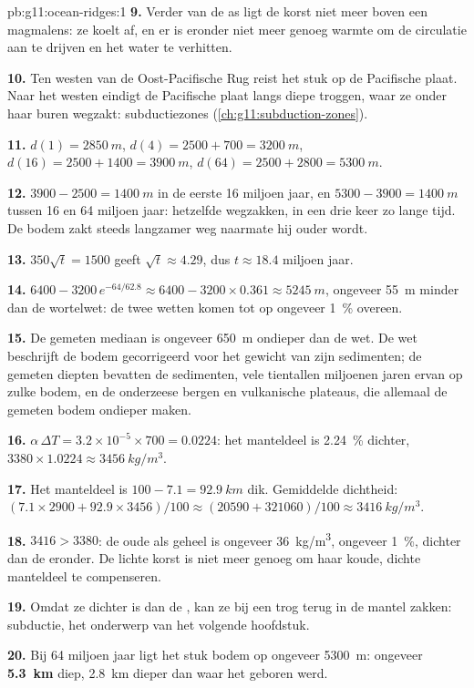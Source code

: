 \begin{solution}{pb:g11:ocean-ridges:1}
\textbf{9.} Verder van de as ligt de korst niet meer boven een magmalens: ze
koelt af, en er is eronder niet meer genoeg warmte om de circulatie aan te drijven
en het water te verhitten.

\textbf{10.} Ten westen van de Oost-Pacifische Rug reist het stuk op de Pacifische
plaat. Naar het westen eindigt de Pacifische plaat langs diepe troggen, waar ze
onder haar buren wegzakt: subductiezones (\cref{ch:g11:subduction-zones}).

\textbf{11.} $d(1) = \qty{2850}{m}$, $d(4) = 2500 + 700 = \qty{3200}{m}$,
$d(16) = 2500 + 1400 = \qty{3900}{m}$, $d(64) = 2500 + 2800 = \qty{5300}{m}$.

\textbf{12.} $3900 - 2500 = \qty{1400}{m}$ in de eerste 16 miljoen jaar,
en $5300 - 3900 = \qty{1400}{m}$ tussen 16 en 64 miljoen jaar: hetzelfde
wegzakken, in een drie keer zo lange tijd. De bodem zakt steeds langzamer weg
naarmate hij ouder wordt.

\textbf{13.} $350\sqrt{t} = 1500$ geeft $\sqrt{t} \approx 4.29$, dus
$t \approx 18.4$ miljoen jaar.

\textbf{14.} $6400 - 3200\,e^{-64/62.8} \approx 6400 - 3200 \times 0.361
\approx \qty{5245}{m}$, ongeveer \qty{55}{m} minder dan de wortelwet: de
twee wetten komen tot op ongeveer \qty{1}{\percent} overeen.

\textbf{15.} De gemeten mediaan is ongeveer \qty{650}{m} ondieper dan de
wet. De wet beschrijft de bodem gecorrigeerd voor het gewicht van zijn sedimenten;
de gemeten diepten bevatten de sedimenten, vele tientallen miljoenen jaren
ervan op zulke bodem, en de onderzeese bergen en vulkanische plateaus, die allemaal
de gemeten bodem ondieper maken.

\textbf{16.} $\alpha\,\Delta T = 3.2 \times 10^{-5} \times 700 = 0.0224$: het
manteldeel is \qty{2.24}{\percent} dichter,
$3380 \times 1.0224 \approx \qty{3456}{kg/m^3}$.

\textbf{17.} Het manteldeel is $100 - 7.1 = \qty{92.9}{km}$ dik. Gemiddelde
dichtheid: $(7.1 \times 2900 + 92.9 \times 3456)/100 \approx (20590 + 321060)/100
\approx \qty{3416}{kg/m^3}$.

\textbf{18.} $3416 > 3380$: de oude  als geheel is ongeveer
\qty{36}{kg/m^3}, ongeveer \qty{1}{\percent}, dichter dan de 
eronder. De lichte korst is niet meer genoeg om haar koude,
dichte manteldeel te compenseren.

\textbf{19.} Omdat ze dichter is dan de , kan ze bij een trog terug in de
mantel zakken: subductie, het onderwerp van het volgende hoofdstuk.

\textbf{20.} Bij 64 miljoen jaar ligt het stuk bodem op ongeveer
\qty{5300}{m}: ongeveer \textbf{5.3~km} diep, \qty{2.8}{km} dieper dan waar het
geboren werd.
\end{solution}
